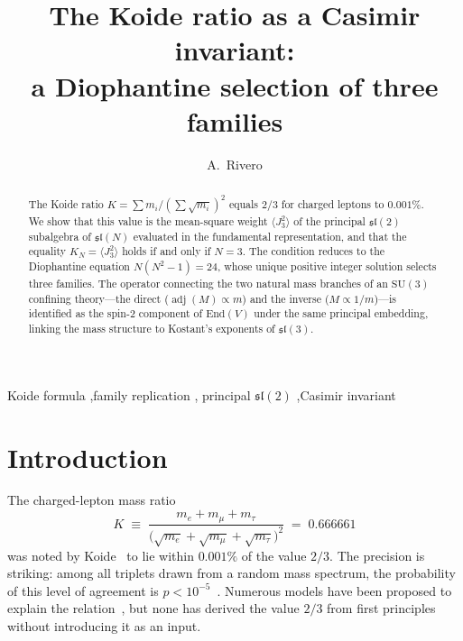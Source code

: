\documentclass[final,3p,times,twocolumn]{elsarticle}
\newcommand{\SU}{\mathrm{SU}}
\newcommand{\adj}{\operatorname{adj}}
\begin{document}
\begin{frontmatter}

\title{The Koide ratio as a Casimir invariant:\\
a Diophantine selection of three families}

\author{A.~Rivero}
\address{Departamento de F\'{\i}sica Te\'orica, Universidad de
Zaragoza, 50009 Zaragoza, Spain}

\begin{abstract}
The Koide ratio $K = \sum m_i / (\sum\sqrt{m_i})^2$
equals $2/3$ for charged leptons to $0.001\%$.
We show that this value is the mean-square weight
$\langle J_3^2\rangle$ of the principal $\mathfrak{sl}(2)$
subalgebra of $\mathfrak{sl}(N)$ evaluated in the fundamental
representation, and that the equality
$K_N = \langle J_3^2\rangle$ holds if and only if $N = 3$.
The condition reduces to the Diophantine equation
$N(N^2 - 1) = 24$, whose unique positive integer solution
selects three families.
The operator connecting the two natural mass branches of an
$\SU(3)$ confining theory---the direct ($\adj(M) \propto m$) and
the inverse ($M \propto 1/m$)---is identified as the spin-2
component of $\mathrm{End}(V)$ under the same principal embedding,
linking the mass structure to Kostant's
exponents of $\mathfrak{sl}(3)$.
\end{abstract}

\begin{keyword}
Koide formula \sep family replication \sep
principal $\mathfrak{sl}(2)$ \sep Casimir invariant
\end{keyword}

\end{frontmatter}


\section{Introduction}

The charged-lepton mass ratio
\begin{equation}
  K \;\equiv\; \frac{m_e + m_\mu + m_\tau}
  {\bigl(\sqrt{m_e} + \sqrt{m_\mu} + \sqrt{m_\tau}\bigr)^2}
  \;=\; 0.666661
  \label{eq:Kdef}
\end{equation}
was noted by Koide~\cite{Koide:1983} to lie within $0.001\%$
of the value $2/3$.
The precision is striking: among all triplets drawn from
a random mass spectrum, the probability of this level
of agreement is $p < 10^{-5}$~\cite{Rivero:2024}.
Numerous models have been proposed to explain the
relation~\cite{Koide:1983,Sumino:2009,Rivero:2024},
but none has derived the value $2/3$ from first principles
without introducing it as an input.
\end{document}
